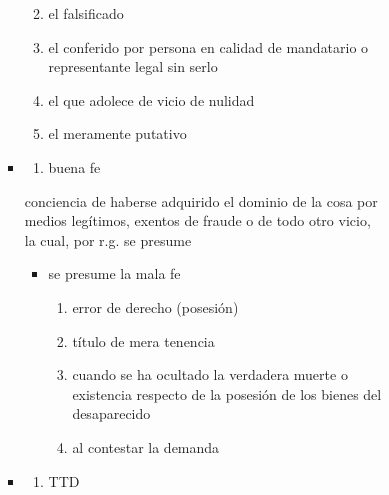 \documentclass[]{article}
\providecommand{\tightlist}{%
  \setlength{\itemsep}{0pt}\setlength{\parskip}{0pt}}
\begin{document}
\begin{itemize}
\begin{itemize}
\begin{itemize}
\begin{itemize}
\begin{itemize}
\begin{itemize}
            \begin{enumerate}
            \def\labelenumi{\arabic{enumi}.}
            \tightlist
            \item
              el falsificado
            \item
              el conferido por persona en calidad de mandatario o
              representante legal sin serlo
            \item
              el que adolece de vicio de nulidad
            \item
              el meramente putativo
            \end{enumerate}
          \item
            \begin{enumerate}
            \def\labelenumi{\alph{enumi})}
            \setcounter{enumi}{1}
            \tightlist
            \item
              buena fe
            \end{enumerate}

            conciencia de haberse adquirido el dominio de la cosa por
            medios legítimos, exentos de fraude o de todo otro vicio, la
            cual, por r.g. se presume

            \begin{itemize}
            \tightlist
            \item
              se presume la mala fe

              \begin{enumerate}
              \def\labelenumi{\arabic{enumi}.}
              \tightlist
              \item
                error de derecho (posesión)
              \item
                título de mera tenencia
              \item
                cuando se ha ocultado la verdadera muerte o existencia
                respecto de la posesión de los bienes del desaparecido
              \item
                al contestar la demanda
              \end{enumerate}
            \end{itemize}
          \item
            \begin{enumerate}
            \def\labelenumi{\alph{enumi})}
            \setcounter{enumi}{2}
            \tightlist
            \item
              TTD
            \end{enumerate}


\end{itemize}
\end{itemize}
\end{itemize}
\end{itemize}
\end{itemize}
\end{itemize}
\end{document}
